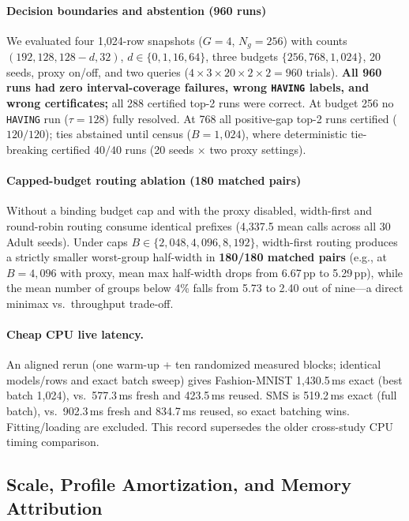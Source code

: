 \paragraph{Decision boundaries and abstention (960 runs)}
We evaluated four 1,024-row snapshots ($G=4$, $N_g=256$) with counts $(192,128,128-d,32)$, $d\in\{0,1,16,64\}$, three budgets $\{256,768,1{,}024\}$, 20 seeds, proxy on/off, and two queries ($4\times3\times20\times2\times2=960$ trials). \textbf{All 960 runs had zero interval-coverage failures, wrong \texttt{HAVING} labels, and wrong certificates;} all 288 certified top-2 runs were correct.
At budget 256 no \texttt{HAVING} run ($\tau=128$) fully resolved. At 768 all positive-gap top-2 runs certified ($120/120$); ties abstained until census ($B=1{,}024$), where deterministic tie-breaking certified $40/40$ runs (20 seeds $\times$ two proxy settings).

\paragraph{Capped-budget routing ablation (180 matched pairs)}
Without a binding budget cap and with the proxy disabled, width-first and round-robin routing consume identical prefixes (4,337.5 mean calls across all 30 Adult seeds).
Under caps $B \in \{2{,}048, 4{,}096, 8{,}192\}$, width-first routing produces a strictly smaller worst-group half-width in \textbf{180/180 matched pairs} (e.g., at $B=4{,}096$ with proxy, mean max half-width drops from 6.67\,pp to 5.29\,pp), while the mean number of groups below 4\% falls from 5.73 to 2.40 out of nine---a direct minimax vs.\ throughput trade-off.

\paragraph{Cheap CPU live latency.}
An aligned rerun (one warm-up + ten randomized measured blocks; identical models/rows and exact batch sweep) gives Fashion-MNIST 1,430.5\,ms exact (best batch 1,024), vs.\ 577.3\,ms fresh and 423.5\,ms reused. SMS is 519.2\,ms exact (full batch), vs.\ 902.3\,ms fresh and 834.7\,ms reused, so exact batching wins. Fitting/loading are excluded. This record supersedes the older cross-study CPU timing comparison.

\subsection{Scale, Profile Amortization, and Memory Attribution}
\label{sec:eval-scale}

